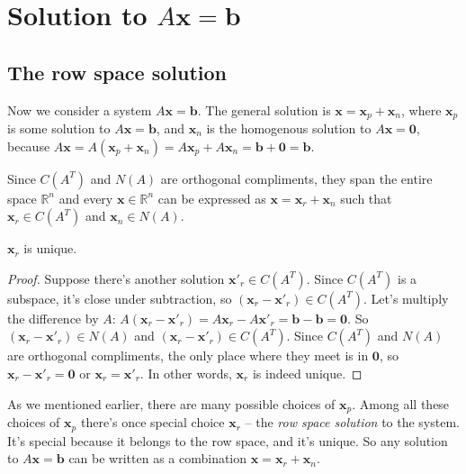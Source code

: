 \documentclass{acm_proc_article-sp}
\begin{document}
\newcommand\hidemath{$A \mathbf x = \mathbf b$}
\section{Solution to {\large \protect\hidemath} }

\subsection{The row space solution}


Now we consider a system $A \mathbf x = \mathbf b$. The general solution is
\(\mathbf x = \mathbf x_p + \mathbf x_n\), where \(\mathbf x_p\) is some solution
to \(A \mathbf x = \mathbf b\), and  \(\mathbf x_n\) is the homogenous solution
to \(A \mathbf x = \mathbf 0\), because \(A \mathbf x = A (\mathbf x_p + \mathbf x_n) = A \mathbf x_p + A \mathbf x_n = \mathbf b + \mathbf 0 = \mathbf b\).


Since \(C(A^T)\) and \(N(A)\) are orthogonal compliments, they span the
entire space \(\mathbb R^n\) and every \(\mathbf x \in \mathbb R^n\) can
be expressed as \(\mathbf x = \mathbf x_r + \mathbf x_n\) such that
\(\mathbf x_r \in C(A^T)\) and \(\mathbf x_n \in N(A)\).

\begin{prop}\(\mathbf x_r\) is unique.\end{prop}

\begin{proof} Suppose there's another
solution \(\mathbf x'_r \in C(A^T)\). Since \(C(A^T)\) is a subspace,
it's close under subtraction, so
\((\mathbf x_r - \mathbf x'_r) \in C(A^T)\). Let's multiply the
difference by \(A\):
\(A(\mathbf x_r - \mathbf x'_r) = A \mathbf x_r - A \mathbf x'_r = \mathbf b - \mathbf b = \mathbf 0\).
So \((\mathbf x_r - \mathbf x'_r) \in N(A)\) and
\((\mathbf x_r - \mathbf x'_r) \in C(A^T)\). Since \(C(A^T)\) and
\(N(A)\) are orthogonal compliments, the only place where they meet is
in \(\mathbf 0\), so \(\mathbf x_r - \mathbf x'_r = \mathbf 0\) or
\(\mathbf x_r = \mathbf x'_r\). In other words, \(\mathbf x_r\) is
indeed unique.
\end{proof}


As we mentioned earlier, there are many possible choices of \(\mathbf x_p\).
Among all these choices of \(\mathbf x_p\) there's once special choice
\(\mathbf x_r\) -- the \emph{row space solution} to the system. It's
special because it belongs to the row space, and it's unique. So any
solution to \(A \mathbf x = \mathbf b\) can be written as a combination
\(\mathbf x = \mathbf x_r + \mathbf x_n\).
\end{document}
